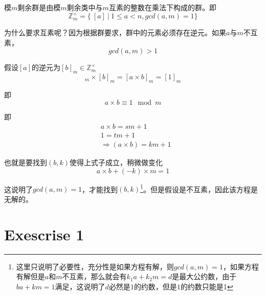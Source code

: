 模$m$剩余群是由模$m$剩余类中与$m$互素的整数在乘法下构成的群。即
\begin{equation}
    \mathbb{Z}^{\times}_m=\{\ [a]\ |\ 1\leqslant a<n,gcd(a,m)=1 \}
\end{equation}

为什么要求互素呢？因为根据群要求，群中的元素必须存在逆元。如果$a$与$m$不互素，
\begin{equation}
    gcd(a,m)>1
\end{equation}

假设$[a]$的逆元为$[b]_m\in \mathbb{Z}^{\times}_m$
\begin{equation}
    [a]_m\times [b]_m=[a\times b]_m=[1]_m
\end{equation}

即
\begin{equation}
    a\times b \equiv 1\mod m
\end{equation}

即
\begin{equation}
    \begin{aligned}
        & a\times b = sm+1\\
        & 1=tm+1\\
        & \Rightarrow (a\times b)=km+1
    \end{aligned}
\end{equation}

也就是要找到$(b,k)$使得上式子成立，稍微做变化
\begin{equation}
    a\times b+(-k)\times m=1
\end{equation}

这说明了$gcd(a,m)=1$，才能找到$(b,k)$\footnote{这里只说明了必要性，充分性是如果方程有解，则$gcd(a,m)=1$，如果方程有解但是$a$和$m$不互素，那么就会有$k_1a+k_2m=d$是最大公约数，由于$ba+km=1$满足，这说明了$d$必然是$1$的约数，但是$1$的约数只能是1}。但是假设是不互素，因此该方程是无解的。

\section{Exescrise 1}

